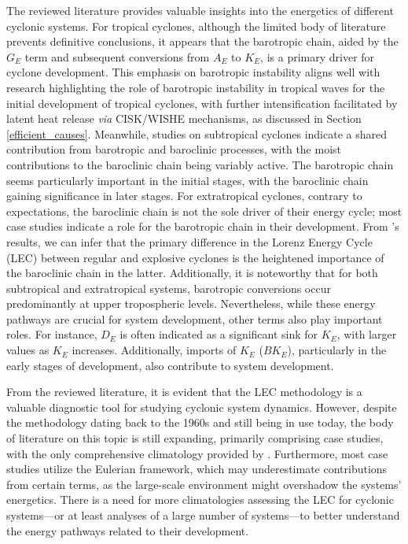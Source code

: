 The reviewed literature provides valuable insights into the energetics of different cyclonic systems. For tropical cyclones, although the limited body of literature prevents definitive conclusions, it appears that the barotropic chain, aided by the \(G_E\) term and subsequent conversions from \(A_E\) to \(K_E\), is a primary driver for cyclone development. This emphasis on barotropic instability aligns well with research highlighting the role of barotropic instability in tropical waves for the initial development of tropical cyclones, with further intensification facilitated by latent heat release \textit{via} CISK/WISHE mechanisms, as discussed in Section \ref{efficient_causes}. Meanwhile, studies on subtropical cyclones indicate a shared contribution from barotropic and baroclinic processes, with the moist contributions to the baroclinic chain being variably active. The barotropic chain seems particularly important in the initial stages, with the baroclinic chain gaining significance in later stages. For extratropical cyclones, contrary to expectations, the baroclinic chain is not the sole driver of their energy cycle; most case studies indicate a role for the barotropic chain in their development. From \citet{black2013universal}'s results, we can infer that the primary difference in the Lorenz Energy Cycle (LEC) between regular and explosive cyclones is the heightened importance of the baroclinic chain in the latter. Additionally, it is noteworthy that for both subtropical and extratropical systems, barotropic conversions occur predominantly at upper tropospheric levels. Nevertheless, while these energy pathways are crucial for system development, other terms also play important roles. For instance, \(D_E\) is often indicated as a significant sink for \(K_E\), with larger values as \(K_E\) increases. Additionally, imports of \(K_E\) (\(BK_E\)), particularly in the early stages of development, also contribute to system development.

From the reviewed literature, it is evident that the LEC methodology is a valuable diagnostic tool for studying cyclonic system dynamics. However, despite the methodology dating back to the 1960s and still being in use today, the body of literature on this topic is still expanding, primarily comprising case studies, with the only comprehensive climatology provided by \citet{black2013universal}. Furthermore, most case studies utilize the Eulerian framework, which may underestimate contributions from certain terms, as the large-scale environment might overshadow the systems' energetics. There is a need for more climatologies assessing the LEC for cyclonic systems—or at least analyses of a large number of systems—to better understand the energy pathways related to their development.
